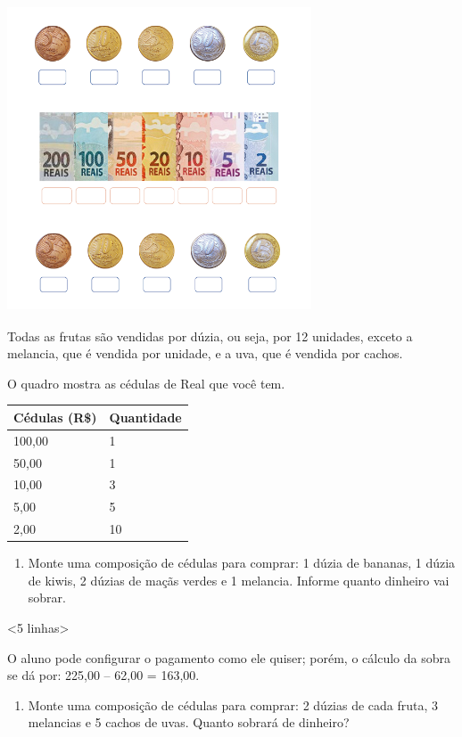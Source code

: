{{{{{{{{{\includegraphics[width=3.55208in,height=3.57292in]{media/image71.png}

Todas as frutas são vendidas por dúzia, ou seja, por 12 unidades, exceto
a melancia, que é vendida por unidade, e a uva, que é vendida por cachos.

O quadro mostra as cédulas de Real que você tem.

\begin{longtable}[]{@{}ll@{}}
\toprule
Cédulas (R\$) & Quantidade\tabularnewline
\midrule
\endhead
100,00 & 1\tabularnewline
50,00 & 1\tabularnewline
10,00 & 3\tabularnewline
5,00 & 5\tabularnewline
2,00 & 10\tabularnewline
\bottomrule
\end{longtable}

\begin{enumerate}
\def\labelenumi{\alph{enumi})}
\item
  Monte uma composição de cédulas para comprar: 1 dúzia de bananas, 1
  dúzia de kiwis, 2 dúzias de maçãs verdes e 1 melancia. Informe quanto
  dinheiro vai sobrar.
\end{enumerate}

\textless{}5 linhas\textgreater{}

O aluno pode configurar o pagamento como ele quiser; porém, o cálculo da
sobra se dá por: 225,00 -- 62,00 = 163,00.

\begin{enumerate}
\def\labelenumi{\alph{enumi})}
\item
  Monte uma composição de cédulas para comprar: 2 dúzias de cada fruta,
  3 melancias e 5 cachos de uvas. Quanto sobrará de dinheiro?
\end{enumerate}

}}}}}}}}}
